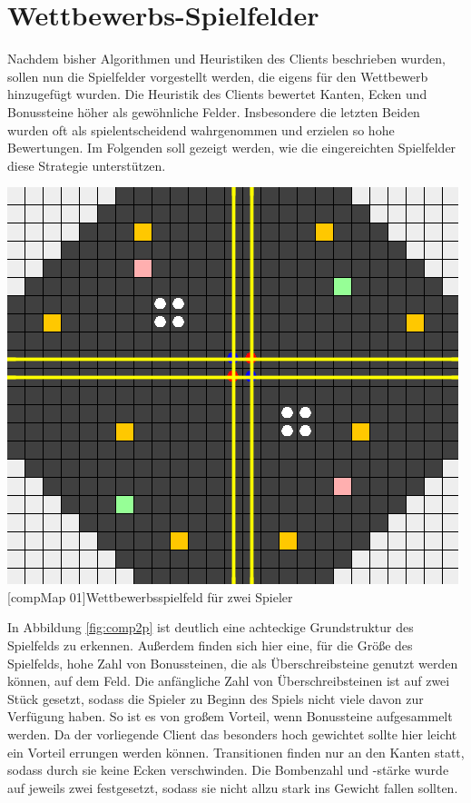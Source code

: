 \documentclass[12pt,a4paper,bibliography=totocnumbered,listof=totocnumbered,ngerman]{scrartcl}
\begin{document}
\section{Wettbewerbs-Spielfelder}
Nachdem bisher Algorithmen und Heuristiken des Clients beschrieben wurden, sollen nun die Spielfelder vorgestellt werden, die eigens für den Wettbewerb hinzugefügt wurden.
Die Heuristik des Clients bewertet Kanten, Ecken und Bonussteine höher als gewöhnliche Felder. Insbesondere die letzten Beiden wurden oft als spielentscheidend wahrgenommen und erzielen so hohe Bewertungen. Im Folgenden soll gezeigt werden, wie die eingereichten Spielfelder diese Strategie unterstützen.


\vspace{1em}
\begin{minipage}{\linewidth}
	\centering
	\includegraphics[width=0.6\linewidth]{pics/comp2019_04_2p.png}
	[compMap 01]{Wettbewerbsspielfeld für zwei Spieler}
	\label{fig:comp2p}
\end{minipage}
\vspace{1em}

In Abbildung \ref{fig:comp2p} ist deutlich eine achteckige Grundstruktur des Spielfelds zu erkennen. Außerdem finden sich hier eine, für die Größe des Spielfelds, hohe Zahl von Bonussteinen, die als Überschreibsteine genutzt werden können, auf dem Feld. Die anfängliche Zahl von Überschreibsteinen ist auf zwei Stück gesetzt, sodass die Spieler zu Beginn des Spiels nicht viele davon zur Verfügung haben. So ist es von großem Vorteil, wenn Bonussteine aufgesammelt werden. Da der vorliegende Client das besonders hoch gewichtet sollte hier leicht ein Vorteil errungen werden können. Transitionen finden nur an den Kanten statt, sodass durch sie keine Ecken verschwinden. Die Bombenzahl und -stärke wurde auf jeweils zwei festgesetzt, sodass sie nicht allzu stark ins Gewicht fallen sollten.  
\end{document}
